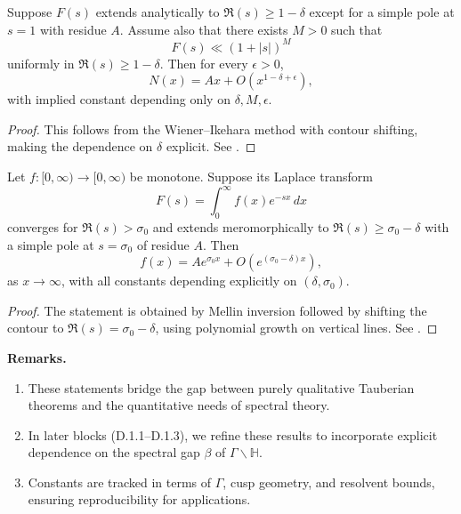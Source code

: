 \begin{lemma}\label{lem:ikehara-effective}
Suppose $F(s)$ extends analytically to $\Re(s)\ge 1-\delta$ except for a simple pole at $s=1$ with residue $A$.  
Assume also that there exists $M>0$ such that
\[
F(s) \ll (1+|s|)^M
\]
uniformly in $\Re(s)\ge 1-\delta$. Then for every $\epsilon>0$,
\[
N(x) = A x + O(x^{1-\delta+\epsilon}),
\]
with implied constant depending only on $\delta, M, \epsilon$.  
\end{lemma}

\begin{proof}
This follows from the Wiener–Ikehara method with contour shifting, making the dependence on $\delta$ explicit. See \cite[Thm.~II.7.11]{Delange1954}.
\end{proof}

\medskip

\begin{proposition}\label{prop:laplace-tauber}
Let $f:[0,\infty)\to [0,\infty)$ be monotone. Suppose its Laplace transform
\[
F(s) = \int_0^\infty f(x) e^{-s x}\, dx
\]
converges for $\Re(s) > \sigma_0$ and extends meromorphically to $\Re(s)\ge \sigma_0-\delta$ with a simple pole at $s=\sigma_0$ of residue $A$. Then
\[
f(x) = A e^{\sigma_0 x} + O(e^{(\sigma_0-\delta) x}),
\]
as $x\to \infty$, with all constants depending explicitly on $(\delta, \sigma_0)$.
\end{proposition}

\begin{proof}
The statement is obtained by Mellin inversion followed by shifting the contour to $\Re(s)=\sigma_0-\delta$, using polynomial growth on vertical lines.  
See \cite{Ingham1935, Korevaar2004}.
\end{proof}

\medskip

\noindent \textbf{Remarks.}  
\begin{enumerate}
  \item These statements bridge the gap between purely qualitative Tauberian theorems and the quantitative needs of spectral theory.  
  \item In later blocks (D.1.1–D.1.3), we refine these results to incorporate explicit dependence on the spectral gap $\beta$ of $\Gamma \backslash \mathbb H$.  
  \item Constants are tracked in terms of $\Gamma$, cusp geometry, and resolvent bounds, ensuring reproducibility for applications.  
\end{enumerate}

